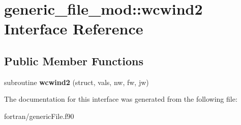 \hypertarget{interfacegeneric__file__mod_1_1wcwind2}{}\section{generic\+\_\+file\+\_\+mod\+:\+:wcwind2 Interface Reference}
\label{interfacegeneric__file__mod_1_1wcwind2}
\subsection*{Public Member Functions}
\begin{DoxyCompactItemize}
\item 
\mbox{\label{interfacegeneric__file__mod_1_1wcwind2_abf7b7a0dcd8708e62a3603a87bb19f71}} 
subroutine {\bfseries wcwind2} (struct, vals, nw, fw, jw)
\end{DoxyCompactItemize}


The documentation for this interface was generated from the following file\+:\begin{DoxyCompactItemize}
\item 
fortran/generic\+File.\+f90\end{DoxyCompactItemize}
